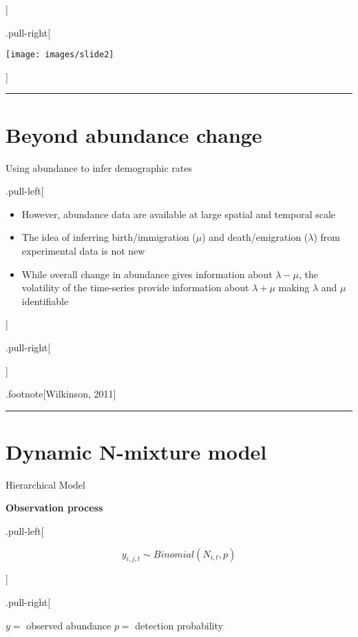 \documentclass[
]{article}
\begin{document}
{]}

.pull-right{[}

\texttt{[image: images/slide2]}

{]}

\begin{center}\rule{0.5\linewidth}{0.5pt}\end{center}

\section{Beyond abundance change}\label{beyond-abundance-change-2}

Using abundance to infer demographic rates

.pull-left{[}

\begin{itemize}
\item
  However, abundance data are available at large spatial and temporal
  scale
\item
  The idea of inferring birth/immigration (\(\mu\)) and death/emigration
  (\(\lambda\)) from experimental data is not new
\item
  While overall change in abundance gives information about
  \(\lambda-\mu\), the volatility of the time-series provide information
  about \(\lambda+\mu\) making \(\lambda\) and \(\mu\) identifiable
\end{itemize}

{]}

.pull-right{[}

{]}

.footnote{[}Wilkinson, 2011{]}

\begin{center}\rule{0.5\linewidth}{0.5pt}\end{center}

\section{Dynamic N-mixture model}\label{dynamic-n-mixture-model}

Hierarchical Model

\textbf{Observation process}

.pull-left{[}

\[y_{i,j,t} \sim Binomial(N_{i,t}, p)\]

{]}

.pull-right{[}

\(y =\) observed abundance \(p =\) detection probability
\end{document}
